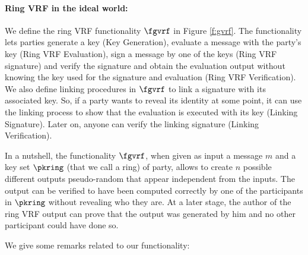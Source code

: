 \paragraph{Ring VRF in the ideal world:} 
We define the ring VRF functionality $ \fgvrf $ in Figure \ref{f:gvrf}. The functionality lets parties generate a key (Key Generation), evaluate a message with the party's key (Ring VRF Evaluation), sign a message by one of the keys (Ring VRF signature) and verify the signature and obtain the evaluation output without knowing the key used for the signature and evaluation (Ring VRF Verification). We also define linking procedures in $ \fgvrf $ to link a signature with its associated key. So, if a party wants to reveal its identity at some point, it can use the linking process to show that the evaluation is executed with its key (Linking Signature). Later on, anyone can verify the linking signature (Linking Verification).

In a nutshell, the functionality $\fgvrf$, when given as input a message $m$ and a key set $\pkring$ (that we call a ring) of party, allows to create $n$ possible different outputs pseudo-random that appear independent from the inputs. The output can be verified to have been computed correctly by one of the participants in $\pkring$ without revealing who they are. At a later stage, the author of the ring VRF output can prove that the output was generated by him and no other participant could have done so.

We give some remarks related to our functionality:


